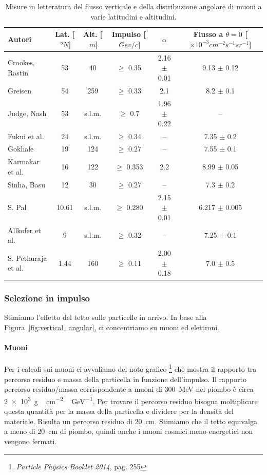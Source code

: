 \begin{table}
	\small
	\hspace{-3.5em}
	\begin{tabular}{lccccc}
		\hline
		Autori & Lat. [$\SI{}{\degree N}$]& Alt. [$\SI{}{m}$]& Impulso [$\SI{}{Gev/c}$] &$\alpha$ & \makecell{Flusso a $\theta=0$\\{}[$\times 10^{-3}\si{cm^{-2}s^{-1}sr^{-1}}$]}\\
		\hline
		Crookes, Rastin \cite{2} & 53 & 40 &$\ge$ 0.35 &2.16 $\pm$ 0.01 &9.13  $\pm$ 0.12\\
		Greisen \cite{3} \cite{4}& 54 & 259 &$\ge$ 0.33& 2.1 &8.2  $\pm$ 0.1\\
		Judge, Nash \cite{5}& 53 & s.l.m. & $\ge$ 0.7 & 1.96  $\pm$ 0.22 & --\\
		Fukui et al. \cite{6}& 24 & s.l.m.& $\ge$ 0.34 &-- &7.35 $\pm$ 0.2\\
		Gokhale \cite{7}& 19 & 124 &$\ge$ 0.27 &-- &7.55 $\pm$ 0.1\\
		Karmakar et al. \cite{8}& 16 & 122 &$\ge$ 0.353 &2.2 &8.99 $\pm$ 0.05\\
		Sinha, Basu \cite{9}& 12 & 30 &$\ge$ 0.27 &-- &7.3 $\pm$ 0.2\\
		S. Pal \cite{10}& 10.61 & s.l.m. &$\ge$ 0.280 &2.15 $\pm$ 0.01 &6.217 $\pm$ 0.005\\
		Allkofer et al. \cite{11}& 9 & s.l.m. &$\ge$ 0.32 &-- &7.25 $\pm$ 0.1\\
		S. Pethuraja et al. \cite{12}&1.44 & 160 &$\ge$ 0.11 &2.00 $\pm$ 0.18 & 7.0 $\pm$ 0.5\\
		\hline
	\end{tabular}
	\caption{\label{tab:letteratura}
	Misure in letteratura del flusso verticale e della distribuzione angolare di muoni
	a varie latitudini e altitudini.}
\end{table}

\subsubsection{Selezione in impulso}

Stimiamo l'effetto del tetto sulle particelle in arrivo.
In base alla Figura~\ref{fig:vertical_angular},
ci concentriamo su muoni ed elettroni.

\paragraph{Muoni}

Per i calcoli sui muoni ci avvaliamo del noto grafico%
\footnote{\emph{Particle Physics Booklet 2014}, pag. 255}
che mostra il rapporto tra percorso residuo e massa della particella in funzione dell'impulso.
Il rapporto percorso residuo/massa corrispondente a muoni di \SI{300}{MeV}
nel piombo è circa \SI{2e3}{g\,cm^{-2}\,GeV^{-1}}.
Per trovare il percorso residuo bisogna moltiplicare questa quantità per la massa della particella
e dividere per la densità del materiale.
Risulta un percorso residuo di \SI{20}{cm}.
Stimiamo che il tetto equivalga a meno di \SI{20}{cm} di piombo,
quindi anche i muoni cosmici meno energetici non vengono fermati.

